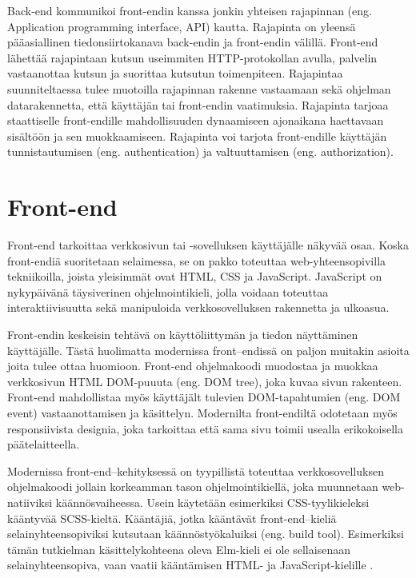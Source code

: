 Back-end kommunikoi front-endin kanssa jonkin yhteisen rajapinnan (eng. Application programming interface, API) kautta.
Rajapinta on yleensä pääasiallinen tiedonsiirtokanava back-endin ja front-endin välillä. Front-end lähettää rajapintaan
kutsun useimmiten HTTP-protokollan avulla, palvelin vastaanottaa kutsun ja suorittaa kutsutun toimenpiteen.
Rajapintaa suunniteltaessa tulee muotoilla rajapinnan rakenne vastaamaan sekä ohjelman datarakennetta, että käyttäjän
tai front-endin vaatimuksia. Rajapinta tarjoaa staattiselle front-endille mahdollisuuden dynaamiseen ajonaikana
haettavaan sisältöön ja sen muokkaamiseen. Rajapinta voi tarjota front-endille käyttäjän tunnistautumisen (eng.
authentication) ja valtuuttamisen (eng. authorization). \cite{fullstackdeveloper}

\section{Front-end}
Front-end tarkoittaa verkkosivun tai -sovelluksen käyttäjälle näkyvää osaa. Koska front-endiä suoritetaan selaimessa,
se on pakko toteuttaa web-yhteensopivilla tekniikoilla, joista yleisimmät ovat HTML, CSS ja JavaScript. JavaScript on
nykypäivänä täysiverinen ohjelmointikieli, jolla voidaan toteuttaa interaktiivisuutta sekä manipuloida verkkosovelluksen
rakennetta ja ulkoasua. \cite{fullstackdeveloper}

Front-endin keskeisin tehtävä on käyttöliittymän ja tiedon näyttäminen käyttäjälle. Tästä huolimatta modernissa
front–endissä on paljon muitakin asioita joita tulee ottaa huomioon. Front-end ohjelmakoodi muodostaa ja muokkaa
verkkosivun HTML DOM-puuuta (eng. DOM tree), joka kuvaa sivun rakenteen. Front-end mahdollistaa myös käyttäjält
tulevien DOM-tapahtumien (eng. DOM event) vastaanottamisen ja käsittelyn. Modernilta front-endiltä odotetaan myös
responsiivista designia, joka tarkoittaa että sama sivu toimii usealla erikokoisella päätelaitteella.
\cite{bignerdfrontend}

Modernissa front-end–kehityksessä on tyypillistä toteuttaa verkkosovelluksen ohjelmakoodi jollain korkeamman tason
ohjelmointikiellä, joka muunnetaan web-natiiviksi käännösvaiheessa. Usein käytetään esimerkiksi CSS-tyylikieleksi
kääntyvää SCSS-kieltä. Kääntäjiä, jotka kääntävät front-end–kieliä selainyhteensopiviksi kutsutaan käännöstyökaluiksi
(eng. build tool). Esimerkiksi tämän tutkielman käsittelykohteena oleva Elm-kieli ei ole sellaisenaan
selainyhteensopiva, vaan vaatii kääntämisen HTML- ja JavaScript-kielille \cite{elmlang}. \cite{fullstackdeveloper}

